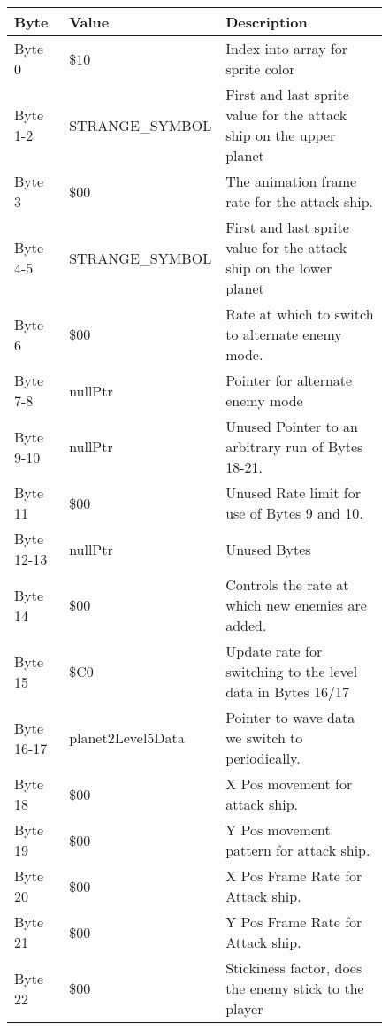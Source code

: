 \begin{figure}[H]
{\begin{adjustbox}{width=12cm}
\begin{tabular}{lll}
\toprule
 Byte       & Value              & Description                                                         \\
\midrule
 Byte 0     & \$10                & Index into array for sprite color                                   \\
 Byte 1-2   & STRANGE\_SYMBOL     & First and last sprite value for the attack ship on the upper planet \\
 Byte 3     & \$00                & The animation frame rate for the attack ship.                       \\
 Byte 4-5   & STRANGE\_SYMBOL     & First and last sprite value for the attack ship on the lower planet \\
 Byte 6     & \$00                & Rate at which to switch to alternate enemy mode.                    \\
 Byte 7-8   & nullPtr            & Pointer for alternate enemy mode                                    \\
 Byte 9-10  & nullPtr            & Unused Pointer to an arbitrary run of Bytes 18-21.                  \\
 Byte 11    & \$00                & Unused Rate limit for use of Bytes 9 and 10.                        \\
 Byte 12-13 & nullPtr            & Unused Bytes                                                        \\
 Byte 14    & \$00                & Controls the rate at which new enemies are added.                   \\
 Byte 15    & \$C0                & Update rate for switching to the level data in Bytes 16/17          \\
 Byte 16-17 & planet2Level5Data  & Pointer to wave data we switch to periodically.                     \\
 Byte 18    & \$00                & X Pos movement for attack ship.                                     \\
 Byte 19    & \$00                & Y Pos movement pattern for attack ship.                             \\
 Byte 20    & \$00                & X Pos Frame Rate for Attack ship.                                   \\
 Byte 21    & \$00                & Y Pos Frame Rate for Attack ship.                                   \\
 Byte 22    & \$00                & Stickiness factor, does the enemy stick to the player               \\

\end{tabular}
\end{adjustbox}}
\end{figure}
